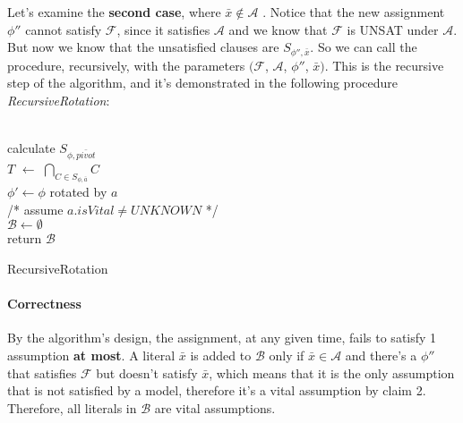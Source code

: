 \documentclass[]{article}
\begin{document}
 
 	 Let's examine the \textbf{second case}, where $ \bar{x} \notin \mathcal{A} $ . Notice that the new assignment $ \phi'' $ cannot satisfy $ \mathcal{F} $, since it satisfies $ \mathcal{A} $ and we know that $ \mathcal{F} $ is UNSAT under $ \mathcal{A} $. But now we know that the unsatisfied clauses are $ S_{\phi'',\bar{x}} $. So we can call the procedure, recursively, with the parameters $ (\mathcal{F} $, $ \mathcal{A} $, $ \phi'' $, $ \bar{x} )$. This is the recursive step of the algorithm, and it's demonstrated in the following procedure \textit{RecursiveRotation}:\\\\
	\begin{algorithm}[H]
		calculate $ S_{\phi,\bar{pivot}} $\\
		$ T $ $ \leftarrow $ $ \bigcap_{C \in S_{\phi,\bar{a}}} C $\\
		$ \phi' \leftarrow \phi $ rotated by $ a $\\
		/* assume $ a.isVital \neq UNKNOWN $ */ \\
		$ \mathcal{B} \leftarrow \emptyset $  \\
		return $ \mathcal{B} $
		\caption{RecursiveRotation}
	\end{algorithm}

	\paragraph{Correctness} By the algorithm's design, the assignment, at any given time, fails to satisfy 1 assumption \textbf{at most}. A literal $ \bar{x} $ is added to $ \mathcal{B} $ only if  $ \bar{x} \in \mathcal{A} $ and there's a $ \phi'' $ that satisfies $ \mathcal{F} $ but doesn't satisfy $ \bar{x} $, which means that it is the only assumption that is not satisfied by a model, therefore it's a vital assumption by claim 2. Therefore, all literals in $ \mathcal{B} $ are vital assumptions.
\end{document}
